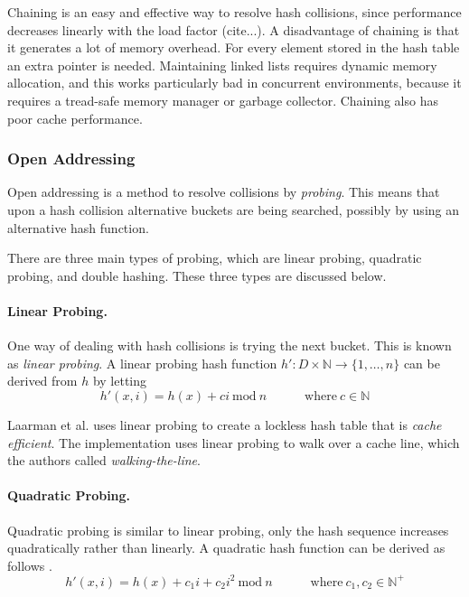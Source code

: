 Chaining is an easy and effective way to resolve hash collisions, since performance decreases linearly with the load factor (cite...). A disadvantage of chaining is that it generates a lot of memory overhead. For every element stored in the hash table an extra pointer is needed. Maintaining linked lists requires dynamic memory allocation, and this works particularly bad in concurrent environments, because it requires a tread-safe memory manager or garbage collector. Chaining also has poor cache performance.

\subsubsection{Open Addressing}
Open addressing is a method to resolve collisions by \emph{probing}. This means that upon a hash collision alternative buckets are being searched, possibly by using an alternative hash function.

There are three main types of probing, which are linear probing, quadratic probing, and double hashing. These three types are discussed below.

\paragraph{Linear Probing.}
One way of dealing with hash collisions is trying the next bucket. This is known as \emph{linear probing}. A linear probing hash function $h' : D \times \mathbb{N} \rightarrow \{ 1, \dots, n \}$ can be derived from $h$ by letting \cite{Cormen:2009:IAT:1614191} 
\begin{equation}
	h'(x, i) = h(x) + ci \ \text{mod} \ n \hspace{36pt} \text{where} \ c \in \mathbb{N}
\end{equation}

Laarman et al. \cite{so73119} uses linear probing to create a lockless hash table that is \emph{cache efficient}. The implementation uses linear probing to walk over a cache line, which the authors called \emph{walking-the-line}.

\paragraph{Quadratic Probing.}
Quadratic probing is similar to linear probing, only the hash sequence increases quadratically rather than linearly. A quadratic hash function can be derived as follows \cite{Cormen:2009:IAT:1614191}.
\begin{equation}
	h'(x, i) = h(x) + c_1 i + c_2 i^2 \ \text{mod} \ n \hspace{36pt} \text{where} \ c_1, c_2 \in \mathbb{N}^+
\end{equation}

